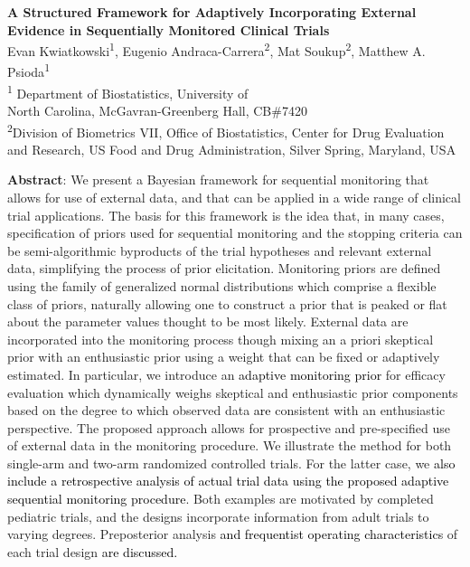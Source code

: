 \documentclass[12pt]{article}
\begin{document}
	\begin{center}
		\textbf{A Structured Framework for Adaptively Incorporating External\\ 
		         Evidence in Sequentially Monitored Clinical Trials} \\

		\vspace{1cm}
			Evan Kwiatkowski\textsuperscript{1}, Eugenio Andraca-Carrera\textsuperscript{2}, 
			Mat Soukup\textsuperscript{2}, Matthew A. Psioda\textsuperscript{1}\\

		\vspace{1cm}
			\textsuperscript{1} Department of Biostatistics, University of \\
			North Carolina, McGavran-Greenberg Hall, CB\#7420 \\

		\vspace{1cm}
			\textsuperscript{2}{Division of Biometrics VII, Office of Biostatistics, Center for Drug Evaluation and Research, US Food and Drug Administration, Silver Spring, Maryland, USA}
	\end{center}


\vspace{1.5cm}
\noindent
\textbf{Abstract}:
{We present a Bayesian framework for sequential monitoring that allows for use of external data, and that 
can be applied in a wide range of clinical trial applications. The basis for this framework is the 
idea that, in many cases, specification of priors used for sequential monitoring and the stopping criteria can be semi-algorithmic byproducts of the trial hypotheses and relevant external data, simplifying the process of prior elicitation. Monitoring priors are defined using the family of generalized normal distributions which comprise a flexible class of priors, naturally allowing one to construct a prior that is peaked or flat about the parameter values thought to be most likely. External data are incorporated into the monitoring process though mixing an a priori skeptical prior with an enthusiastic prior using a weight that can be fixed or adaptively estimated. In particular, we introduce an \textcolor{black}{adaptive monitoring prior} for efficacy evaluation which dynamically weighs skeptical and enthusiastic prior components based on the degree to which observed data \textcolor{black}{are} consistent with an enthusiastic perspective. The proposed approach allows for prospective and pre-specified use of external data in the monitoring procedure.
%
We illustrate the method for both single-arm and two-arm randomized controlled trials. For the latter case, we \textcolor{black}{also include a retrospective analysis of actual trial data using the proposed adaptive sequential monitoring procedure}. Both examples are motivated by completed pediatric trials, and the designs incorporate information from adult trials to varying degrees. Preposterior analysis \textcolor{black}{and frequentist operating characteristics} of each trial design \textcolor{black}{are discussed.}}
\end{document}

